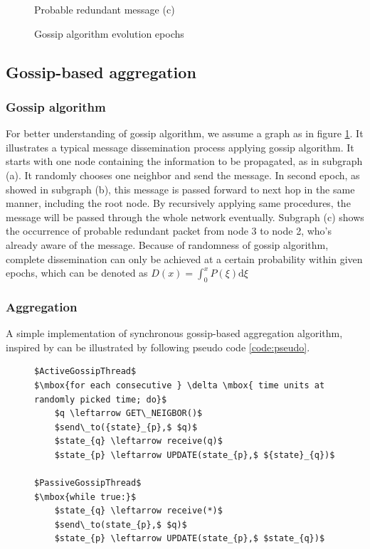 \begin{figure}[h!]
\begin{center}
\begin{minipage}[c]{0.45\textwidth}
      Probable redundant message (c)
   	\end{minipage}
   \end{center}
   \caption{Gossip algorithm evolution epochs}
   \label{fig:epochs}
\end{figure}
\subsection{Gossip-based aggregation}

\subsubsection{Gossip algorithm}
For better understanding of gossip algorithm, we assume a graph as in figure \ref{fig:epochs}. It illustrates a typical message dissemination process applying gossip algorithm. It starts with one node containing the information to be propagated, as in subgraph (a). It randomly chooses one neighbor and send the message. In second epoch, as showed in subgraph (b), this message is passed forward to next hop in the same manner, including the root node. By recursively applying same procedures, the message will be passed through the whole network eventually. Subgraph (c) shows the occurrence of probable redundant packet from node 3 to node 2, who's already aware of the message. Because of randomness of gossip algorithm, complete dissemination can only be achieved at a certain probability within given epochs, which can be denoted as $D(x)=\int_0^x P(\xi)\mathrm{d}\xi$\\


\subsubsection{Aggregation}

A simple implementation of synchronous gossip-based aggregation algorithm, inspired by \cite{jelasity_gossip-based_2005} can be illustrated by following pseudo code \ref{code:pseudo}.
\begin{figure}[!h]
\begin{lstlisting}[caption={Pseudo Code for gossip-based aggregation}, label=code:pseudo, mathescape=true, captionpos=b]
$ActiveGossipThread$
$\mbox{for each consecutive } \delta \mbox{ time units at randomly picked time; do}$
    $q \leftarrow GET\_NEIGBOR()$
    $send\_to({state}_{p},$ $q)$
    $state_{q} \leftarrow receive(q)$
    $state_{p} \leftarrow UPDATE(state_{p},$ ${state}_{q})$

$PassiveGossipThread$
$\mbox{while true:}$
    $state_{q} \leftarrow receive(*)$
    $send\_to(state_{p},$ $q)$
    $state_{p} \leftarrow UPDATE(state_{p},$ $state_{q})$
\end{lstlisting}
\end{figure}

